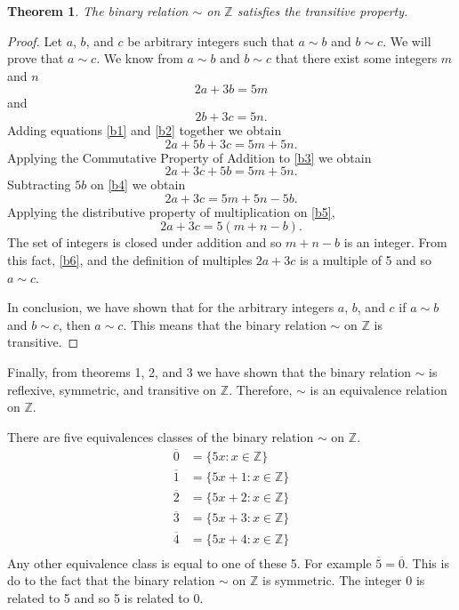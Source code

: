 \documentclass[12pt]{article}
\newtheorem{thm}{Theorem}
\begin{document}
\begin{thm}
The binary relation $\sim$ on $\mathbb{Z}$ satisfies the transitive property.
\end{thm}
\begin{proof}
Let $a$, $b$, and $c$ be arbitrary integers such that $a\sim b$ and $b\sim c$. We will prove that $a\sim c$. We know from $a\sim b$ and $b\sim c$ that there exist some integers $m$ and $n$
\begin{equation}\label{b1}
2a + 3b = 5m
\end{equation}
and
\begin{equation}\label{b2}
2b + 3c = 5n.
\end{equation}
Adding equations \eqref{b1} and \eqref{b2} together we obtain
\begin{equation}\label{b3}
2a + 5b +3c = 5m + 5n.
\end{equation}
Applying the Commutative Property of Addition to \eqref{b3} we obtain
\begin{equation}\label{b4}
2a + 3c + 5b = 5m + 5n.
\end{equation}
Subtracting $5b$ on \eqref{b4} we obtain
\begin{equation}\label{b5}
2a + 3c = 5m + 5n - 5b.
\end{equation}
Applying the distributive property of multiplication on \eqref{b5},
\begin{equation}\label{b6}
2a + 3c = 5(m+n-b).
\end{equation}
The set of integers is closed under addition and so $m+n-b$ is an integer. From this fact, \eqref{b6}, and the definition of multiples $2a + 3c$ is a multiple of 5 and so $a\sim c$.

In conclusion, we have shown that for the arbitrary integers $a$, $b$, and $c$ if $a\sim b$ and $b\sim c$, then $a\sim c$. This means that the binary relation $\sim$ on $\mathbb{Z}$ is transitive.
\end{proof}

Finally, from theorems 1, 2, and 3 we have shown that the binary relation $\sim$ is reflexive, symmetric, and transitive on $\mathbb{Z}$. Therefore, $\sim$ is an equivalence relation on $\mathbb{Z}$.

\newpage
There are five equivalences classes of the binary relation $\sim$ on $\mathbb{Z}$.
\begin{align*}
\overline{0} &= \{5x: x \in \mathbb{Z}\}\\
\overline{1} &= \{5x + 1: x \in \mathbb{Z}\}\\
\overline{2} &= \{5x + 2: x \in \mathbb{Z}\}\\
\overline{3} &= \{5x + 3: x \in \mathbb{Z}\}\\
\overline{4} &= \{5x + 4: x \in \mathbb{Z}\}\\
\end{align*}
Any other equivalence class is equal to one of these 5. For example $\overline{5} = \overline{0}$. This is do to the fact that the binary relation $\sim$ on $\mathbb{Z}$ is symmetric. The integer 0 is related to 5 and so 5 is related to 0.
\end{document}
